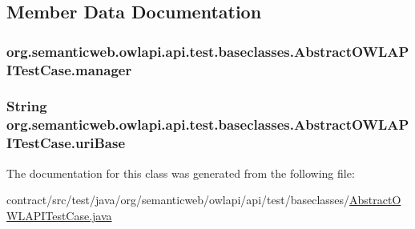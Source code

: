 \subsection{Member Data Documentation}
\hypertarget{classorg_1_1semanticweb_1_1owlapi_1_1api_1_1test_1_1baseclasses_1_1_abstract_o_w_l_a_p_i_test_case_a5e0587825a2eefc46bf4c757755ed186}{
\subsubsection[{manager}]{ org.\-semanticweb.\-owlapi.\-api.\-test.\-baseclasses.\-Abstract\-O\-W\-L\-A\-P\-I\-Test\-Case.\-manager\hspace{0.3cm}{\ttfamily [private]}}}\label{classorg_1_1semanticweb_1_1owlapi_1_1api_1_1test_1_1baseclasses_1_1_abstract_o_w_l_a_p_i_test_case_a5e0587825a2eefc46bf4c757755ed186}
\hypertarget{classorg_1_1semanticweb_1_1owlapi_1_1api_1_1test_1_1baseclasses_1_1_abstract_o_w_l_a_p_i_test_case_a8afc4e3ce69779c469a0d5620e6b902c}{
\subsubsection[{uri\-Base}]{\setlength{\rightskip}{0pt plus 5cm}String org.\-semanticweb.\-owlapi.\-api.\-test.\-baseclasses.\-Abstract\-O\-W\-L\-A\-P\-I\-Test\-Case.\-uri\-Base\hspace{0.3cm}{\ttfamily [private]}}}\label{classorg_1_1semanticweb_1_1owlapi_1_1api_1_1test_1_1baseclasses_1_1_abstract_o_w_l_a_p_i_test_case_a8afc4e3ce69779c469a0d5620e6b902c}


The documentation for this class was generated from the following file\-:\begin{DoxyCompactItemize}
\item 
contract/src/test/java/org/semanticweb/owlapi/api/test/baseclasses/\hyperlink{_abstract_o_w_l_a_p_i_test_case_8java}{Abstract\-O\-W\-L\-A\-P\-I\-Test\-Case.\-java}\end{DoxyCompactItemize}
